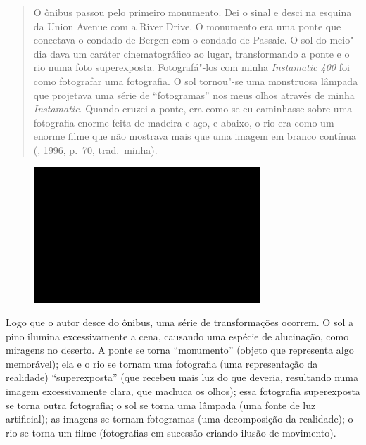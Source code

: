 \begin{quote}
O ônibus passou pelo primeiro monumento. Dei o sinal e desci na esquina
da Union Avenue com a River Drive. O monumento era uma ponte que
conectava o condado de Bergen com o condado de Passaic. O sol do meio"-dia dava um caráter cinematográfico ao lugar, transformando a ponte e o
rio numa foto superexposta. Fotografá"-los com minha \emph{Instamatic 400} foi
como fotografar uma fotografia. O sol tornou"-se uma monstruosa lâmpada
que projetava uma série de ``fotogramas'' nos meus olhos através de
minha \emph{Instamatic}. Quando cruzei a ponte, era como se eu caminhasse sobre
uma fotografia enorme feita de madeira e aço, e abaixo, o rio era como
um enorme filme que não mostrava mais que uma imagem em branco contínua
(, 1996, p.~70, trad.~minha).
\end{quote}

\begin{figure}[!ht]

\centering
 \includegraphics[width=85mm]{./imgs/im1.jpg}
\caption{\tiny{}}

\end{figure}

Logo que o autor desce do ônibus, uma série de transformações ocorrem. O
sol a pino ilumina excessivamente a cena, causando uma espécie de
alucinação, como miragens no deserto. A ponte se torna ``monumento''
(objeto que representa algo memorável); ela e o rio se tornam uma
fotografia (uma representação da realidade) ``superexposta'' (que
recebeu mais luz do que deveria, resultando numa imagem excessivamente
clara, que machuca os olhos); essa fotografia superexposta se torna
outra fotografia; o sol se torna uma lâmpada (uma fonte de luz
artificial); as imagens se tornam fotogramas (uma decomposição da
realidade); o rio se torna um filme (fotografias em sucessão criando
ilusão de movimento).

